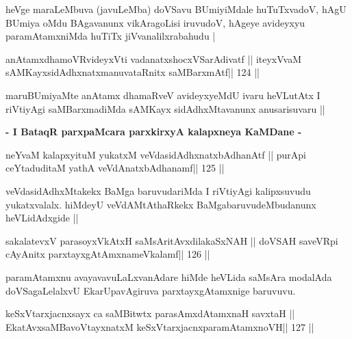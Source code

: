 \begin{artha}
heVge maraLeMbuva (javuLeMba) doVSavu BUmiyiMdale huTuTxvadoV, hAgU BUmiya oMdu
BAgavanunx vikAragoLisi iruvudoV, hAgeye avideyxyu paramAtamxniMda
huTiTx jiVvanalilxrabahudu |
\end{artha}


\begin{shl}
anAtamxdhamoVR\s videyxVti vadanatxshocxVSarAdivatf ||
iteyxVvaM sAMKayxsidAdhxnatxmanuvataRnitx saMBarxmAtf\hfill || 124 ||
\end{shl}

\begin{artha}
maruBUmiyaMte anAtamx dhamaRveV avideyxyeMdU ivaru heVLutAtx I
riVtiyAgi saMBarxmadiMda sAMKayx sidAdhxMtavanunx anusarisuvaru ||
\end{artha}

\begin{center}
\textbf{- I BataqR parxpaMcara parxkirxyA kalapxneya KaMDane -}
\end{center}

\begin{shl}
neYvaM kalapxyituM yukatxM veVdasidAdhxnatxbAdhanAtf ||
purA\s pi ceYtaduditaM yathA veVdAnatxbAdhanamf\hfill || 125 ||
\end{shl}

\begin{artha}
veVdasidAdhxMtakekx BaMga baruvudariMda I riVtiyAgi kalipxsuvudu
yukatxvalalx. hiMdeyU veVdAMtAthaRkekx BaMgabaruvudeMbudanunx
heVLidAdxgide ||
\end{artha}


\begin{shl}
sakalatevxV parasoyxVkAtxH saMsAritAvxdilakaSxNAH ||
doVSAH saveVR\s pi cA\s\s yAnitx parxtayxgAtAmxnameVkalamf\hfill || 126 ||
\end{shl}

\begin{artha}
paramAtamxnu avayavavuLaLxvanAdare hiMde heVLida saMsAra modalAda
doVSagaLelalxvU EkarUpavAgiruva parxtayxgAtamxnige baruvuvu.
\end{artha}

\begin{shl}
keSxVtarxjacnxsayx ca saMBitwtx parasAmxdAtamxnaH savxtaH ||
EkatAvxsaMBavoV\s tayxnatxM keSxVtarxjacnxparamAtamxnoVH\hfill || 127 ||
\end{shl}

